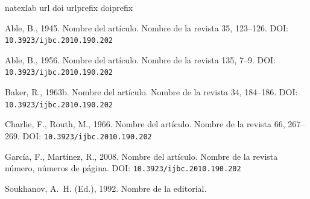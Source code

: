 \documentclass[5p,times,authoryear]{elsarticle}
\begin{document}









\begin{thebibliography}{7}
\expandafter\ifx\csname natexlab\endcsname\relax\def\natexlab#1{#1}\fi
\expandafter\ifx\csname url\endcsname\relax
  \def\url#1{\texttt{#1}}\fi
\expandafter\ifx\csname doi\endcsname\relax
  \def\doi#1{\texttt{#1}}\fi
\expandafter\ifx\csname urlprefix\endcsname\relax\def\urlprefix{URL: }\fi
\expandafter\ifx\csname doiprefix\endcsname\relax\def\doiprefix{DOI: }\fi

Able, B., 1945. Nombre del artículo. Nombre de la revista 35, 123--126.
\newline\doiprefix\doi{10.3923/ijbc.2010.190.202}

Able, B., 1956. Nombre del artículo. Nombre de la revista 135, 7--9.
\newline\doiprefix\doi{10.3923/ijbc.2010.190.202}

\bibitem[{Baker(1963{\natexlab{b}})}]{Bak:63b}
Baker, R., 1963{\natexlab{b}}. Nombre del artículo. Nombre de la revista 34,
  184--186.
\newline\doiprefix\doi{10.3923/ijbc.2010.190.202}

Charlie, F., Routh, M., 1966. Nombre del artículo. Nombre de la revista 66,
  267--269.
\newline\doiprefix\doi{10.3923/ijbc.2010.190.202}

García, F., Martínez, R., 2008. Nombre del artículo. Nombre de la revista
  número, {}números de página.
\newline\doiprefix\doi{10.3923/ijbc.2010.190.202}

Soukhanov, A.~H. (Ed.), 1992. Nombre de la editorial.


 \end{thebibliography}

\appendix
\end{document}
